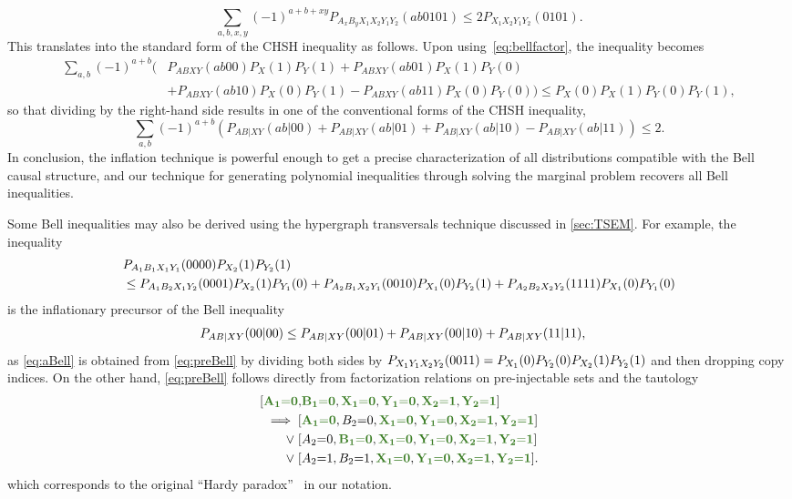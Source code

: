 \documentclass[aps,english,superscriptaddress,onecolumn,twoside,longbibliography,pra,floatfix,fleqn,nofootinbib]{revtex4-1}%
\newcommand*{\mgreen}[1]{{\color{OliveGreen}{\mathbf{#1}}}}
\theoremstyle{definition}
\newcommand{\p}[2][]{{P_{#1}}\parenths{#2}}
\newcommand{\cramp}[1]{\ensuremath{\mathord{#1}}}
\newcommand{\eql}{\cramp{=}}
\DeclarePairedDelimiter{\parenths}{\lparen}{\rparen}
\begin{document}
\[
	\sum_{a,b,x,y} (-1)^{a + b + xy} P_{A_x B_y X_1 X_2 Y_1 Y_2}(a b 0 1 0 1) \leq 2 P_{X_1 X_2 Y_1 Y_2}(0101).
\]
This translates into the standard form of the CHSH inequality as follows. Upon using~\cref{eq:bellfactor}, the inequality becomes
\begin{align*}
	\sum_{a,b} (-1)^{a + b} \big( & P_{A B X Y}(ab00)P_X(1)P_Y(1) + P_{A B X Y}(ab01)P_X(1)P_Y(0) \\[-4pt]
	& + P_{A B X Y}(ab10)P_X(0)P_Y(1) - P_{A B X Y}(ab11)P_X(0)P_Y(0) \big) \leq P_X(0)P_X(1)P_Y(0)P_Y(1),
\end{align*}
so that dividing by the right-hand side results in one of the conventional forms of the CHSH inequality,
\[
	\sum_{a,b} (-1)^{a + b} \left( P_{AB|XY}(ab|00) + P_{AB|XY}(ab|01) + P_{AB|XY}(ab|10) - P_{AB|XY}(ab|11) \right) \leq 2.
\]
In conclusion, the inflation technique is powerful enough to get a precise characterization of all distributions compatible with the Bell causal structure, and our technique for generating polynomial inequalities through solving the marginal problem recovers all Bell inequalities.

Some Bell inequalities may also be derived using the hypergraph transversals technique discussed in \cref{sec:TSEM}. For example, the inequality
\begin{align}\label{eq:preBell}\begin{split}
& \p[A_1 B_1 X_1 Y_1]{0000}\p[X_2]{1} \p[Y_2]{1} \\
&\leq
 \p[A_1 B_2 X_1 Y_2]{0001}\p[X_2]{1} \p[Y_1]{0} +\p[A_2 B_1 X_2 Y_1]{0010}\p[X_1]{0}\p[Y_2]{1}+  \p[A_2 B_2 X_2 Y_2]{1111}\p[X_1]{0} \p[Y_1]{0}
\end{split}\end{align}
is the inflationary precursor of the Bell inequality
\begin{align}\label{eq:aBell}
 \p[A B | X Y]{00|00} &\leq \p[A B | X Y]{00|01} +\p[A B | X Y]{00|10}+  \p[A B | X Y]{11|11},
\end{align}
as \cref{eq:aBell} is obtained from \cref{eq:preBell} by dividing both sides by $\p[X_1 Y_1 X_2 Y_2]{0011}=\p[X_1]{0} \p[Y_2]{0}\p[X_2]{1} \p[Y_2]{1}$ and then dropping copy indices. On the other hand, \cref{eq:preBell} follows directly from factorization relations on pre-injectable sets and the tautology
\begin{align}\begin{split}
	[ \mgreen{A_1 \eql 0}, & \mgreen{B_1 \eql 0}, \mgreen{X_1 \eql 0}, \mgreen{Y_1\eql 0}, \mgreen{X_2 \eql 1}, \mgreen{Y_2 \eql 1}]\\
 \implies 
	[ & \mgreen{A_1 \eql 0}, B_2 \eql 0, \mgreen{X_1 \eql 0}, \mgreen{Y_1\eql 0}, \mgreen{X_2 \eql 1}, \mgreen{Y_2 \eql 1}] \\
	\mathrel{\lor} [ & A_2 \eql 0, \mgreen{B_1 \eql 0}, \mgreen{X_1 \eql 0}, \mgreen{Y_1\eql 0}, \mgreen{X_2 \eql 1}, \mgreen{Y_2 \eql 1}] \\
	\mathrel{\lor} [ & A_2 \eql 1, B_2 \eql 1, \mgreen{X_1 \eql 0}, \mgreen{Y_1\eql 0}, \mgreen{X_2 \eql 1}, \mgreen{Y_2 \eql 1}].
\end{split}\end{align}
which corresponds to the original ``Hardy paradox''~\cite{L.Hardy:PRL:1665} in our notation.
\end{document}
